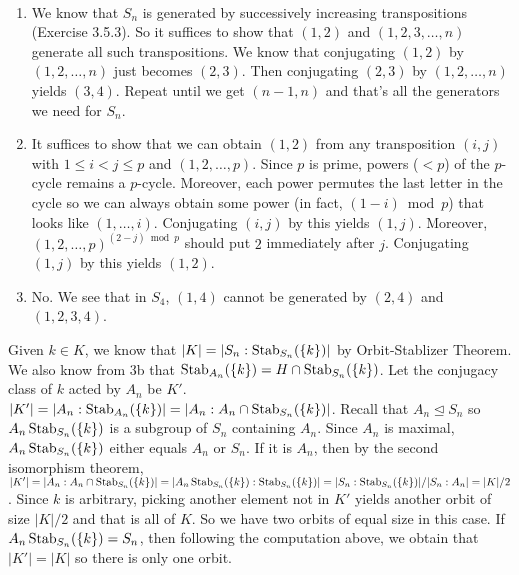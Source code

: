 \documentclass[12pt]{article}
\begin{document}
\begin{problem}[5]
~\begin{enumerate}[label=(\alph*)]
	\item We know that $ S_n$ is generated by successively increasing transpositions (Exercise 3.5.3). So it suffices to show that $ (1,2)$ and  $ (1,2,3,\ldots,n)$ generate all such transpositions. We know that conjugating $ (1,2)$ by  $ (1,2,\ldots,n)$ just becomes $ (2,3)$. Then conjugating  $ (2,3)$ by  $ (1,2,\ldots,n)$ yields $ (3,4)$. Repeat until we get  $ (n-1,n)$ and that's all the generators we need for  $ S_n$.
	\item It suffices to show that we can obtain $ (1,2)$ from any transposition $ (i,j)$ with $ 1 \leq i <j \leq p$ and $ (1,2,\ldots,p)$. Since $ p$ is prime, powers ($ <p$) of the  $ p$-cycle remains a  $ p$-cycle. Moreover, each power permutes the last letter in the cycle so we can always obtain some power (in fact, $ (1-i) \bmod p$) that looks like $ (1,\ldots,i)$. Conjugating $ (i,j)$ by this yields  $ (1,j)$. Moreover,  $ (1,2,\ldots,p)^{(2-j) \bmod p}$ should put $ 2$ immediately after  $ j$. Conjugating $ (1,j)$ by this yields  $ (1,2)$.
	\item No. We see that in  $ S_4$, $ (1,4)$  cannot be generated by  $ (2,4)$ and  $ (1,2,3,4)$.
\end{enumerate}
\end{problem}

\begin{problem}[6]
Given $ k \in K$, we know that $ |K| = |S_n : \operatorname{Stab}_{ S_n}( \{k\} ) |$ by Orbit-Stablizer Theorem. We also know from 3b that $ \operatorname{Stab}_{ A_n}( \{k\} ) = H \cap \operatorname{Stab}_{ S_n}( \{k\} ) $. Let the conjugacy class of $ k$ acted by  $ A_n$ be $ K'$. $ |K'| = |A_n: \operatorname{Stab}_{ A_n}( \{k\} )| = |A_n: A_n \cap \operatorname{Stab}_{ S_n}( \{k\})|$. Recall that $ A_n \trianglelefteq S_n$ so $A_n \operatorname{Stab}_{ S_n}(\{k\}  ) $ is a subgroup of $ S_n$ containing $ A_n$. Since $ A_n$ is maximal, $ A_n \operatorname{Stab}_{ S_n}( \{k\} ) $ either equals $ A_n$ or $ S_n$. If it is $ A_n$, then by the second isomorphism theorem, $ |K'| = |A_n : A_n \cap \operatorname{Stab}_{ S_n}( \{k\} ) | = |A_n \operatorname{Stab}_{ S_n}( \{k\} ): \operatorname{Stab}_{ S_n}( \{k\} ) | = |S_n: \operatorname{Stab}_{ S_n}( \{k\} ) | /|S_n: A_n| = |K|/2$. Since $ k$ is arbitrary, picking another element not in  $ K'$ yields another orbit of size $ |K|/2$ and that is all of  $ K$. So we have two orbits of equal size in this case. If  $ A_n \operatorname{Stab}_{ S_n}( \{k\} ) = S_n$, then following the computation above, we obtain that $ |K'| = |K|$ so there is only one orbit.
\end{problem}
\end{document}
